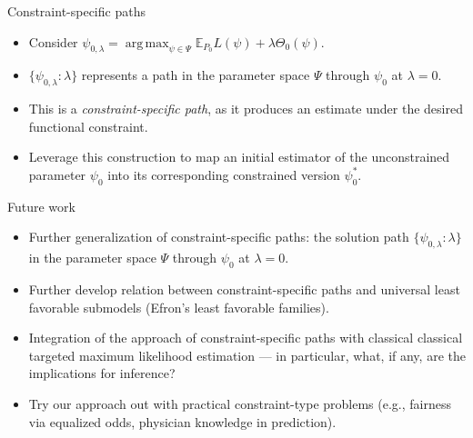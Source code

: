 \documentclass[12pt,t,handout]{beamer}
\newcommand{\E}{\mathbb{E}}
\DeclareMathOperator*{\argmax}{arg\,max}
\begin{document}

\begin{frame}[c]{Constraint-specific paths}

\begin{center}
\begin{itemize}
  \item Consider $\psi_{0, \lambda} = \argmax_{\psi \in \Psi} \E_{P_0}L(\psi) +
    \lambda \Theta_0(\psi)$.
  \item $\{\psi_{0, \lambda} : \lambda\}$ represents a path in the parameter
    space $\Psi$ through $\psi_0$ at $\lambda = 0$.
  \item This is a \textit{constraint-specific path}, as it produces an estimate
    under the desired functional constraint.
  \item Leverage this construction to map an initial estimator of the
    unconstrained parameter $\psi_0$ into its corresponding constrained version
    $\psi_0^*$.
\end{itemize}
\end{center}

\note{
}

\end{frame}


\begin{frame}[c]{Future work}

\begin{center}
\begin{itemize}
  \itemsep12pt
  \item Further generalization of constraint-specific paths: the solution path
    $\{\psi_{0, \lambda}: \lambda\}$ in the parameter space $\Psi$ through
    $\psi_0$ at $\lambda = 0$.
  \item Further develop relation between constraint-specific paths and universal
    least favorable submodels (Efron's least favorable families).
  \item Integration of the approach of constraint-specific paths with classical
    classical targeted maximum likelihood estimation --- in particular, what, if
    any, are the implications for inference?
  \item Try our approach out with practical constraint-type problems (e.g.,
    fairness via equalized odds, physician knowledge in prediction).
\end{itemize}
\end{center}

\note{
}

\end{frame}
\end{document}

